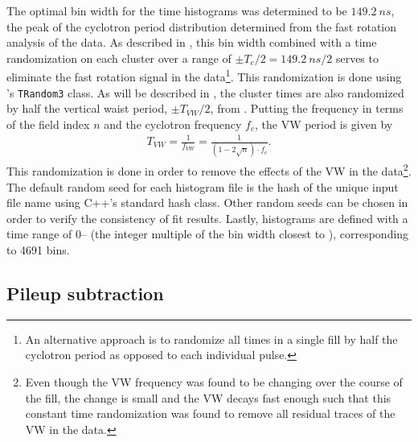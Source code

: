 The optimal bin width for the time histograms was determined to be $\SI{149.2}{ns}$, the peak of the cyclotron period distribution determined from the fast rotation analysis of the data. As described in , this bin width combined with a time randomization on each cluster over a range of $\pm T_{c}/2 = \SI{149.2}{ns} / 2$ serves to eliminate the fast rotation signal in the data\footnote{An alternative approach is to randomize all times in a single fill by half the cyclotron period as opposed to each individual pulse.}. This randomization is done using \ROOT's \texttt{TRandom3} class. As will be described in , the cluster times are also randomized by half the vertical waist period, $\pm T_{VW}/2$, from . Putting the frequency in terms of the field index $n$ and the cyclotron frequency $f_{c}$, the VW period is given by
    \begin{align}
        T_{VW} = \frac{1}{f_{VW}} = \frac{1}{(1-2\sqrt{n}) \cdot f_{c}}.
    \end{align}
This randomization is done in order to remove the effects of the VW in the data\footnote{Even though the VW frequency was found to be changing over the course of the fill, the change is small and the VW decays fast enough such that this constant time randomization was found to remove all residual traces of the VW in the data.}. The default random seed for each histogram \ROOT file is the hash of the unique input file name using C++'s standard hash class. Other random seeds can be chosen in order to verify the consistency of fit results. Lastly, histograms are defined with a time range of 0-- (the integer multiple of the bin width closest to ), corresponding to 4691 bins. 




\subsection{Pileup subtraction}
\label{sub:pileupsubtraction}


